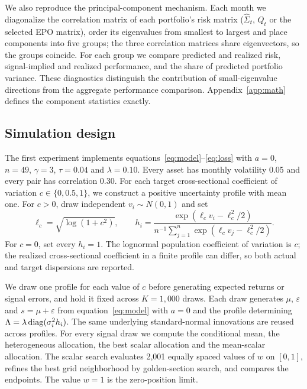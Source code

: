 We also reproduce the principal-component mechanism. Each month we diagonalize the correlation matrix of each portfolio's risk matrix ($\widehat\Sigma_t$, $Q_t$ or the selected EPO matrix), order its eigenvalues from smallest to largest and place components into five groups; the three correlation matrices share eigenvectors, so the groups coincide. For each group we compare predicted and realized risk, signal-implied and realized performance, and the share of predicted portfolio variance. These diagnostics distinguish the contribution of small-eigenvalue directions from the aggregate performance comparison. Appendix~\ref{app:math} defines the component statistics exactly.

\subsection{Simulation design}
\label{sec:simulation-method}
The first experiment implements equations~\eqref{eq:model}--\eqref{eq:loss} with $a=0$, $n=49$, $\gamma=3$, $\tau=0.04$ and $\lambda=0.10$. Every asset has monthly volatility 0.05 and every pair has correlation 0.30. For each target cross-sectional coefficient of variation $c\in\{0,0.5,1\}$, we construct a positive uncertainty profile with mean one. For $c>0$, draw independent $v_i\sim N(0,1)$ and set
\begin{equation}
\ell_c=\sqrt{\log(1+c^2)},
\qquad
h_i=\frac{\exp(\ell_c v_i-\ell_c^2/2)}
{n^{-1}\sum_{j=1}^{n}\exp(\ell_c v_j-\ell_c^2/2)}.
\label{eq:simulation-profile}
\end{equation}
For $c=0$, set every $h_i=1$. The lognormal population coefficient of variation is $c$; the realized cross-sectional coefficient in a finite profile can differ, so both actual and target dispersions are reported.

We draw one profile for each value of $c$ before generating expected returns or signal errors, and hold it fixed across $K=1{,}000$ draws. Each draw generates $\mu$, $\varepsilon$ and $s=\mu+\varepsilon$ from equation~\eqref{eq:model} with $a=0$ and the profile determining $\Lambda=\lambda\operatorname{diag}(\sigma_i^2h_i)$. The same underlying standard-normal innovations are reused across profiles. For every signal draw we compute the conditional mean, the heterogeneous allocation, the best scalar allocation and the mean-scalar allocation. The scalar search evaluates 2,001 equally spaced values of $w$ on $[0,1]$, refines the best grid neighborhood by golden-section search, and compares the endpoints. The value $w=1$ is the zero-position limit.

